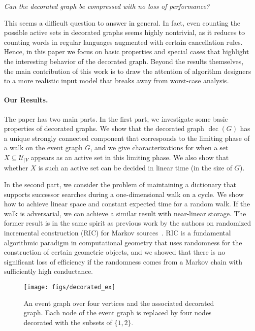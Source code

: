 \documentclass[oribibl,envcountsect,envcountsame]{llncs}
\DeclareMathOperator{\dec}{dec}
\newcommand{\U}{\mathcal U}
\begin{document}
\begin{center}
\emph{Can the decorated graph
be compressed with no loss of performance?}
\end{center}


This seems a difficult question to answer in general. 
In fact, even counting the possible active sets in decorated graphs seems
highly nontrivial, as it reduces to counting words 
in regular languages augmented 
with certain cancellation rules. Hence, in this paper we 
focus on basic properties and special cases that highlight
the interesting behavior of the decorated graph.
Beyond the results themselves, the main contribution
of this work is to draw the attention of algorithm designers 
to a more realistic
input model that breaks away from worst-case analysis.

\paragraph{Our Results.}
The paper has two main parts. In the first part, 
we investigate some basic properties of decorated graphs.
We show that the decorated graph $\dec(G)$ has a unique strongly connected
component that corresponds to the limiting phase of a walk
on the event graph $G$, and we give characterizations
for when a set $X \subseteq \U_{|V}$ appears as an active set 
in this limiting phase. We also show that whether $X$ is such an
active set can be decided in linear time (in the size of $G$).

In the second part, we consider the problem of maintaining a dictionary
that supports successor searches during a one-dimensional
walk on a cycle. We show how to achieve linear space and constant 
expected time for a random walk. If the walk is adversarial,
we can achieve a similar result with near-linear storage.
The former result  is in
the same spirit as previous work by the authors on randomized incremental 
construction (RIC) for Markov sources~\cite{ChazelleMu09}. 
RIC is a fundamental algorithmic paradigm
in computational geometry that uses randomness for the construction
of certain geometric objects, and we showed that there is no 
significant loss of efficiency if the  randomness comes 
from a Markov chain with sufficiently high 
conductance.

\begin{figure}
\begin{center}
\texttt{[image: figs/decorated\_ex]}
\end{center}
\caption{An event graph over four vertices and the associated
  decorated graph. Each node of the event graph is replaced by
  four nodes decorated with the subsets of $\{1,2\}$.
}
\label{fig:decorated_ex}
\end{figure}
\end{document}
